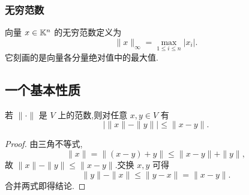 \subsubsection{无穷范数}

向量 $x\in\mathbb{K}^n$ 的无穷范数定义为
\[
    \|x\|_\infty=\max_{1\le i\le n}|x_i|.
\]
它刻画的是向量各分量绝对值中的最大值.

\subsection{一个基本性质}

\begin{lemma}
若 $\|\cdot\|$ 是 $V$ 上的范数,则对任意 $x,y\in V$ 有
\[
    \bigl|\|x\|-\|y\|\bigr|\le \|x-y\|.
\]
\end{lemma}

\begin{proof}
由三角不等式,
\[
    \|x\|=\|(x-y)+y\|\le \|x-y\|+\|y\|,
\]
故 $\|x\|-\|y\|\le \|x-y\|$.交换 $x,y$ 可得
\[
    \|y\|-\|x\|\le \|y-x\|=\|x-y\|.
\]
合并两式即得结论.
\end{proof}
